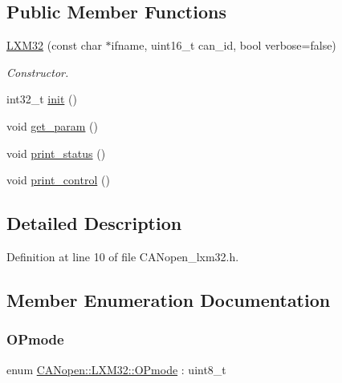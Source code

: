 \subsection*{Public Member Functions}
\begin{DoxyCompactItemize}
\item 
\hyperlink{class_c_a_nopen_1_1_l_x_m32_aa4a3e84b72c79b4d47e9f842a8977f98}{L\+X\+M32} (const char $\ast$ifname, uint16\+\_\+t can\+\_\+id, bool verbose=false)
\begin{DoxyCompactList}\small\item\em Constructor. \end{DoxyCompactList}\item 
int32\+\_\+t \hyperlink{class_c_a_nopen_1_1_l_x_m32_a3d325b9b19432dc05240ccfc328363d9}{init} ()
\item 
void \hyperlink{class_c_a_nopen_1_1_l_x_m32_a22ac99e21e6c32626046d320c7bd3605}{get\+\_\+param} ()
\item 
void \hyperlink{class_c_a_nopen_1_1_l_x_m32_a201d8f9da28994a92612e2618b7a1167}{print\+\_\+status} ()
\item 
void \hyperlink{class_c_a_nopen_1_1_l_x_m32_a545b23fab3528a8039bb2cc62808f9f5}{print\+\_\+control} ()
\end{DoxyCompactItemize}


\subsection{Detailed Description}


Definition at line 10 of file C\+A\+Nopen\+\_\+lxm32.\+h.



\subsection{Member Enumeration Documentation}
\mbox{\label{class_c_a_nopen_1_1_l_x_m32_ac925b7d916f09f6b9ede53099ca7f136}} 
\subsubsection{\texorpdfstring{O\+Pmode}{OPmode}}
{\footnotesize\ttfamily enum \hyperlink{class_c_a_nopen_1_1_l_x_m32_ac925b7d916f09f6b9ede53099ca7f136}{C\+A\+Nopen\+::\+L\+X\+M32\+::\+O\+Pmode} \+: uint8\+\_\+t}

